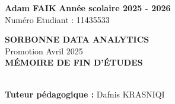 \documentclass[12pt, a4paper]{report}
\begin{document}
\begin{titlepage}
    \begin{center}
        
        

        \begin{flushleft}
            \textbf{Adam FAIK} \hfill \textbf{Année scolaire 2025 - 2026} \\[0.2cm]
            Numéro Etudiant : 11435533
        \end{flushleft}
        \vspace{1cm}

        {\Large \textbf{SORBONNE DATA ANALYTICS}} \\[0.3cm]
        {\large Promotion Avril 2025} \\[1.5cm]

    {\huge \textbf{MÉMOIRE DE FIN D'ÉTUDES}} \\[1.5cm]

         \\[1.5cm]

        \vfill

        \begin{flushleft}
            \textbf{Tuteur pédagogique :} Dafnis KRASNIQI
        \end{flushleft}

    \end{center}
\end{titlepage}


\end{document}
